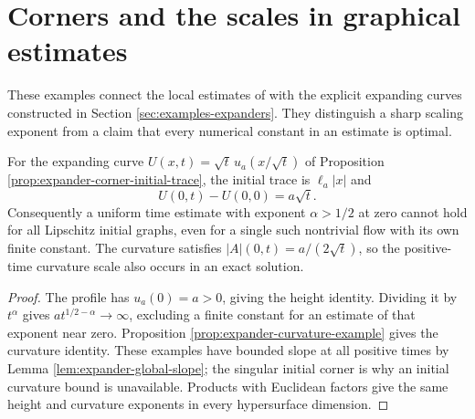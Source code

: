 \chapter{Corners and the scales in graphical estimates}\label{sec:examples-graphical-cutoff-scales}
These examples connect the local estimates of \cite{EH91} with the explicit expanding curves constructed in Section \ref{sec:examples-expanders}. They distinguish a sharp scaling exponent from a claim that every numerical constant in an estimate is optimal.

\begin{example}\label{ex:graphical-half-time-sharpness}
For the expanding curve $U(x,t)=\sqrt t\,u_a(x/\sqrt t)$ of Proposition \ref{prop:expander-corner-initial-trace}, the initial trace is $\ell_a|x|$ and
\[
 U(0,t)-U(0,0)=a\sqrt t.
\]
Consequently a uniform time estimate with exponent $\alpha>1/2$ at zero cannot hold for all Lipschitz initial graphs, even for a single such nontrivial flow with its own finite constant. The curvature satisfies $|A|(0,t)=a/(2\sqrt t)$, so the positive-time curvature scale also occurs in an exact solution.
\end{example}
\begin{proof}
The profile has $u_a(0)=a>0$, giving the height identity. Dividing it by $t^\alpha$ gives $a t^{1/2-\alpha}\to\infty$, excluding a finite constant for an estimate of that exponent near zero. Proposition \ref{prop:expander-curvature-example} gives the curvature identity. These examples have bounded slope at all positive times by Lemma \ref{lem:expander-global-slope}; the singular initial corner is why an initial curvature bound is unavailable. Products with Euclidean factors give the same height and curvature exponents in every hypersurface dimension.
\end{proof}

